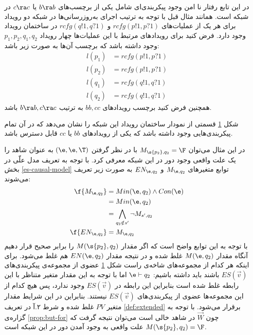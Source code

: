 در این تابع رفتار نا امن وجود پیکربندی‌ای شامل یکی از برچسب‌های
$b \ra b$
یا
$c \ra c$
در شبکه است.
همانند مثال قبل با توجه به ترتیب اجرای به‌روز‌رسانی‌ها در شبکه دو رویداد برای هر یک از عملیات‌های
$rcfg(p!1,p?1)$
و
$rcfg(q!1,q?1)$
در ساختمان رویداد وجود دارد.
فرض کنید برای رویداد‌های مرتبط با این عملیات‌ها چهار رویداد
$p_1,p_2,q_1,q_2$
وجود داشته باشد که برچسب آن‌ها به صورت زیر باشد:
\begin{align*}
    l(p_1) & = rcfg(p!1,p?1) \\
    l(p_2) & = rcfg(p!1,p?1) \\
    l(q_1) & = rcfg(q!1,q?1) \\
    l(q_2) & = rcfg(q!1,q?1)
\end{align*}
همچنین فرض کنید برچسب رویداد‌های
$bb,cc$
به ترتیب
$b\ra b,c\ra c$
باشد.
\begin{figure}
    \centering
    \caption{}
    \label{fig:loop:es}
\end{figure}
شکل
\ref{fig:loop:es}
قسمتی از نمودار ساختمان رویداد این شبکه را نشان می‌دهد که در آن تمام پیکر‌بندی‌هایی وجود داشته باشد که یکی از رویداد‌های
$bb$
یا
$cc$
قابل دسترس باشد.

در این مثال می‌توان
$M_{\s{p_2},q_2}= \F$
با در نظر گرفتن
$(\e,\e,\T)$
به عنوان شاهد را یک علت واقعی وجود دور در این شبکه
معرفی کرد.
با توجه به تعریف مدل علّی در بخش
\ref{es-causal-model}
توابع متغیر‌های
$M_{\e,q_2}$
و
$EN_{\e,q_2}$
به صورت زیر تعریف می‌شوند:
\begin{align*}
    \f{M_{\e,q_2}}  & = Min(\e,q_2) \wedge Con(\e) \\
                    & = Min(\e,q_2)                \\
                    & =  \bigwedge_{q_2 \notin s'}
    \neg M_{s',q_2}                                \\
    \f{EN_{\e,q_2}} & = M_{\e,q_2}
\end{align*}
با توجه به این توابع واضح است که
اگر مقدار
$M(\s{p_2},q_2)$
را برابر صحیح قرار دهیم آنگاه مقدار
$M(\e,q_2)$
غلط شده و در نتیجه مقدار
$EN(\e,q_2)$
هم غلط می‌شود.
برای اینکه هر کدام از مجموعه‌های شاخه‌ی راست شکل
\ref{fig:loop:es}
عضوی از مجموعه‌ی پیکربندی‌های
$ES(\vec v)$
باشند باید داشته باشیم:
$\e \vdash q_2$
اما با توجه به این مقدار متغیر متناظر با این رابطه غلط شده است بنابراین این رابطه در
$ES(\vec v)$
وجود ندارد، پس هیچ کدام از این مجموعه‌ها عضوی از پیکربندی‌های
$ES(\vec v)$
نیستند.
بنابراین در این شرایط مقدار متغیر
$PV$
غلط شده و شرط ۲.آ در تعریف
\ref{def:extended}
برقرار می‌شود.
با توجه به گزاره‌ی
\ref{prop:but-for}
چون
$\vec W$
در شاهد خالی است می‌توان نتیجه گرفت که
$M(\s{p_2},q_2) = \F$
علت واقعی به وجود آمدن دور در این شبکه است.

